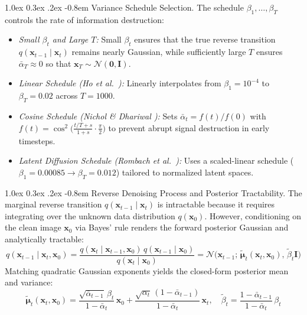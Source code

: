 \documentclass[10pt,a4paper]{article}
\makeatletter
\renewcommand\paragraph{\@startsection{paragraph}{4}{\z@}%
                                    {1.0ex \@plus 0.3ex \@minus .2ex}%
                                    {-0.8em}%
                                    {\normalfont\normalsize\bfseries}}
\makeatother
\begin{document}
\paragraph{Variance Schedule Selection.}
The schedule $\beta_1, \dots, \beta_T$ controls the rate of information destruction:
\begin{itemize}[leftmargin=1.5em, itemsep=0.25em]
    \item \textit{Small $\beta_t$ and Large $T$:} Small $\beta_t$ ensures that the true reverse transition $q(\mathbf{x}_{t-1} \mid \mathbf{x}_t)$ remains nearly Gaussian, while sufficiently large $T$ ensures $\bar{\alpha}_T \approx 0$ so that $\mathbf{x}_T \sim \mathcal{N}(\mathbf{0}, \mathbf{I})$.
    \item \textit{Linear Schedule (Ho et al.\ \cite{ho2020denoising}):} Linearly interpolates from $\beta_1 = 10^{-4}$ to $\beta_T = 0.02$ across $T=1000$.
    \item \textit{Cosine Schedule (Nichol \& Dhariwal \cite{nichol2021improved}):} Sets $\bar{\alpha}_t = f(t)/f(0)$ with $f(t) = \cos^2\!\big(\frac{t/T + s}{1 + s} \cdot \frac{\pi}{2}\big)$ to prevent abrupt signal destruction in early timesteps.
    \item \textit{Latent Diffusion Schedule (Rombach et al.\ \cite{rombach2022high}):} Uses a scaled-linear schedule ($\beta_1 = 0.00085 \to \beta_T = 0.012$) tailored to normalized latent spaces.
\end{itemize}

\paragraph{Reverse Denoising Process and Posterior Tractability.}
The marginal reverse transition $q(\mathbf{x}_{t-1} \mid \mathbf{x}_t)$ is intractable because it requires integrating over the unknown data distribution $q(\mathbf{x}_0)$. However, conditioning on the clean image $\mathbf{x}_0$ via Bayes' rule renders the forward posterior Gaussian and analytically tractable:
\begin{equation}
    q(\mathbf{x}_{t-1} \mid \mathbf{x}_t, \mathbf{x}_0) = \frac{q(\mathbf{x}_t \mid \mathbf{x}_{t-1}, \mathbf{x}_0)\,q(\mathbf{x}_{t-1} \mid \mathbf{x}_0)}{q(\mathbf{x}_t \mid \mathbf{x}_0)} = \mathcal{N}\big(\mathbf{x}_{t-1}; \, \tilde{\bm{\mu}}_t(\mathbf{x}_t, \mathbf{x}_0), \, \tilde{\beta}_t \mathbf{I}\big)
    \label{eq:posterior_bayes}
\end{equation}
Matching quadratic Gaussian exponents yields the closed-form posterior mean and variance:
\begin{equation}
    \tilde{\bm{\mu}}_t(\mathbf{x}_t, \mathbf{x}_0) = \frac{\sqrt{\bar{\alpha}_{t-1}}\,\beta_t}{1 - \bar{\alpha}_t}\,\mathbf{x}_0 + \frac{\sqrt{\alpha_t}\,(1 - \bar{\alpha}_{t-1})}{1 - \bar{\alpha}_t}\,\mathbf{x}_t, \quad \tilde{\beta}_t = \frac{1 - \bar{\alpha}_{t-1}}{1 - \bar{\alpha}_t}\,\beta_t
    \label{eq:posterior_mean}
\end{equation}
\end{document}
